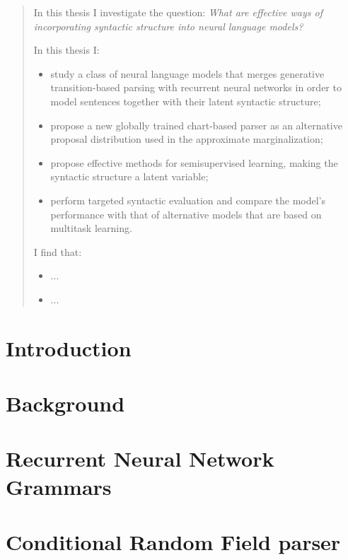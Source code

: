 \documentclass[examplefnt,biber]{../src/nowfnt} %
\subtitle{Neural language models with latent syntax}
\begin{document}
\makeabstracttitle

\begin{abstract}
In this thesis I investigate the question: \textit{What are effective ways of incorporating syntactic structure into neural language models?}

In this thesis I:
\begin{itemize}
  \item study a class of neural language models that merges generative transition-based parsing with recurrent neural networks in order to model sentences together with their latent syntactic structure;
  \item propose a new globally trained chart-based parser as an alternative proposal distribution used in the approximate marginalization;
  \item propose effective methods for semisupervised learning, making the syntactic structure a latent variable;
  \item perform targeted syntactic evaluation and compare the model's performance with that of alternative models that are based on multitask learning.
\end{itemize}
I find that:
\begin{itemize}
  \item ...
  \item ...
\end{itemize}
\end{abstract}

\begin{acknowledgements}
\end{acknowledgements}


\chapter{Introduction}
\label{01-introduction}



\chapter{Background}
\label{02-background}



\chapter{Recurrent Neural Network Grammars}
\label{03-rnng}



\chapter{Conditional Random Field parser}
\label{04-crf}

\end{document}
